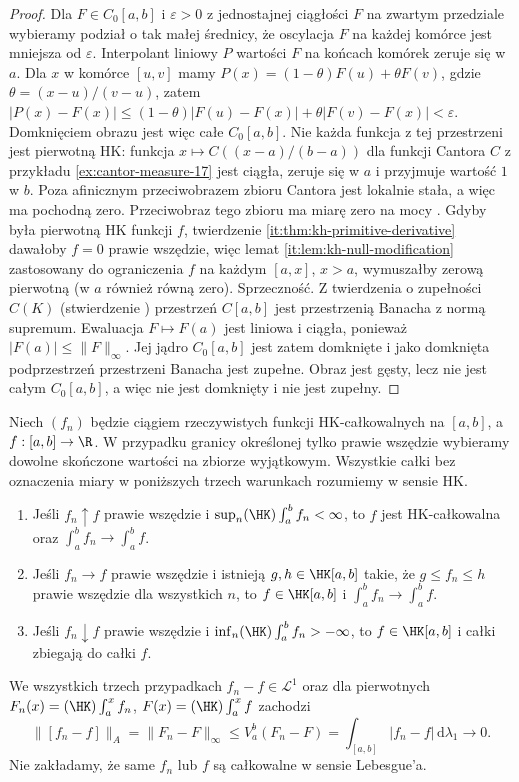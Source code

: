 \begin{proof}
 Dla $F\in C_0[a,b]$ i $\varepsilon>0$ z jednostajnej ciągłości $F$ na zwartym przedziale wybieramy podział o tak małej średnicy, że oscylacja $F$ na każdej komórce jest mniejsza od $\varepsilon$. Interpolant liniowy $P$ wartości $F$ na końcach komórek zeruje się w $a$. Dla $x$ w komórce $[u,v]$ mamy $P(x)=(1-\theta)F(u)+\theta F(v)$, gdzie $\theta=(x-u)/(v-u)$, zatem $|P(x)-F(x)|\le (1-\theta)|F(u)-F(x)|+\theta|F(v)-F(x)|<\varepsilon$. Domknięciem obrazu jest więc całe $C_0[a,b]$. Nie każda funkcja z tej przestrzeni jest pierwotną HK: funkcja $x\mapsto C((x-a)/(b-a))$ dla funkcji Cantora $C$ z przykładu \ref{ex:cantor-measure-17} jest ciągła, zeruje się w $a$ i przyjmuje wartość $1$ w $b$. Poza afinicznym przeciwobrazem zbioru Cantora jest lokalnie stała, a więc ma pochodną zero. Przeciwobraz tego zbioru ma miarę zero na mocy . Gdyby była pierwotną HK funkcji $f$, twierdzenie \ref{it:thm:kh-primitive-derivative} dawałoby $f=0$ prawie wszędzie, więc lemat \ref{it:lem:kh-null-modification} zastosowany do ograniczenia $f$ na każdym $[a,x]$, $x>a$, wymuszałby zerową pierwotną (w $a$ również równą zero). Sprzeczność. Z twierdzenia o zupełności $C(K)$ (stwierdzenie ) przestrzeń $C[a,b]$ jest przestrzenią Banacha z normą supremum. Ewaluacja $F\mapsto F(a)$ jest liniowa i ciągła, ponieważ $|F(a)|\le\|F\|_\infty$. Jej jądro $C_0[a,b]$ jest zatem domknięte i jako domknięta podprzestrzeń przestrzeni Banacha jest zupełne. Obraz jest gęsty, lecz nie jest całym $C_0[a,b]$, a więc nie jest domknięty i nie jest zupełny.
\end{proof}
\begin{twierdzenie}\label{it:thm:hk-limit-theorems}\label{ma1:kh:thm:kh-order-limits}
Niech $(f_n)$ będzie ciągiem rzeczywistych funkcji
HK-całkowalnych na $[a,b]$, a $f:[a,b]\to\R$.
W przypadku granicy określonej tylko prawie wszędzie
wybieramy dowolne skończone wartości na zbiorze
wyjątkowym. Wszystkie całki bez oznaczenia miary
w poniższych trzech warunkach rozumiemy w sensie HK.
\begin{enumerate}[label=(\alph*)]
\item Jeśli $f_n\uparrow f$ prawie wszędzie i $\sup_n(\HK)\int_a^b f_n<\infty$, to $f$ jest HK-całkowalna oraz $\int_a^b f_n\to\int_a^b f$.
\item Jeśli $f_n\to f$ prawie wszędzie i istnieją $g,h\in\HK[a,b]$ takie, że $g\le f_n\le h$ prawie wszędzie dla wszystkich $n$, to $f\in\HK[a,b]$ i $\int_a^b f_n\to\int_a^b f$.
\item Jeśli $f_n\downarrow f$ prawie wszędzie i
$\inf_n(\HK)\int_a^b f_n>-\infty$, to $f\in\HK[a,b]$
i całki zbiegają do całki $f$.
\end{enumerate}
We wszystkich trzech przypadkach $f_n-f\in\mathcal L^1$
oraz dla pierwotnych $F_n(x)=(\HK)\int_a^x f_n$,
$F(x)=(\HK)\int_a^x f$ zachodzi
\[
 \|[f_n-f]\|_A
 =\|F_n-F\|_\infty
 \le V_a^b(F_n-F)
 =\int_{[a,b]}|f_n-f|\,\mathrm d\lambda_1\longrightarrow0.
\]
Nie zakładamy, że same $f_n$ lub $f$ są całkowalne
w sensie Lebesgue'a.
\end{twierdzenie}
